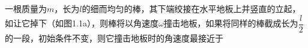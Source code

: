 一根质量为$m$，长为$l$的细而均匀的棒，其下端绞接在水平地板上并竖直的立起，如让它掉下（如图1.1a），则棒将以角速度$ω$撞击地板，如果将同样的棒截成长为$\dfrac{l}{2}$的一段，初始条件不变，则它撞击地板时的角速度最接近于
\option{2\omega}
{\omega}
{\omega}
{}
\begin{figure}[!h]
	\centering
	\quad

\end{figure}

